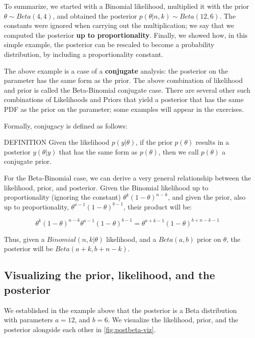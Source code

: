 \documentclass[12pt,]{krantz}
\renewenvironment{quote}{\begin{VF}}{\end{VF}}
\theoremstyle{definition}
\theoremstyle{definition}
\theoremstyle{definition}
\theoremstyle{remark}
\begin{document}
To summarize, we started with a Binomial likelihood, multiplied it with
the prior \(\theta \sim Beta(4,4)\), and obtained the posterior
\(p(\theta|n,k) \sim Beta(12,6)\). The constants were ignored when
carrying out the multiplication; we say that we computed the posterior
\textbf{up to proportionality}. Finally, we showed how, in this simple
example, the posterior can be rescaled to become a probability
distribution, by including a proportionality constant.

The above example is a case of a \textbf{conjugate} analysis: the
posterior on the parameter has the same form as the prior. The above
combination of likelihood and prior is called the Beta-Binomial
conjugate case. There are several other such combinations of Likelihoods
and Priors that yield a posterior that has the same PDF as the prior on
the parameter; some examples will appear in the exercises.

Formally, conjugacy is defined as follows:

\begin{quote}
DEFINITION Given the likelihood \(p(y| \theta)\), if the prior
\(p(\theta)\) results in a posterior \(y(\theta|y)\) that has the same
form as \(p(\theta)\), then we call \(p(\theta)\) a conjugate prior.
\end{quote}

For the Beta-Binomial case, we can derive a very general relationship
between the likelihood, prior, and posterior. Given the Binomial
likelihood up to proportionality (ignoring the constant)
\(\theta^k (1-\theta)^{n-k}\), and given the prior, also up to
proportionality, \(\theta^{a-1} (1-\theta)^{b-1}\), their product will
be:

\begin{equation}
\theta^k (1-\theta)^{n-k} \theta^{a-1} (1-\theta)^{b-1} = \theta^{a+k-1} (1-\theta)^{b+n-k-1} 
\end{equation}

Thus, given a \(Binomial(n,k|\theta)\) likelihood, and a \(Beta(a,b)\)
prior on \(\theta\), the posterior will be \(Beta(a+k,b+n-k)\).

\subsection{Visualizing the prior, likelihood, and the
posterior}\label{visualizing-the-prior-likelihood-and-the-posterior}

We established in the example above that the posterior is a Beta
distribution with parameters \(a=12\), and \(b = 6\). We visualize the
likelihood, prior, and the posterior alongside each other in
\ref{fig:postbeta-viz}.
\end{document}
